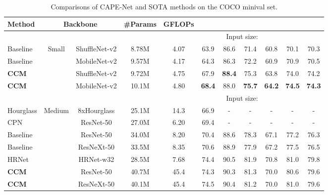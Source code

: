 \documentclass[twocolumn]{svjour3}          \smartqed  \usepackage{natbib}
\begin{document}
\begin{table*}[htbp]
\centering
  \caption{Comparisons of CAPE-Net and SOTA methods on the COCO minival set.}
    \begin{tabular}{llccccccccc}
\toprule
      Method    & \multicolumn{2}{c}{Backbone} & \#Params & GFLOPs &    &   &   &    &    &  \\
    \midrule
     & &  & & \multicolumn{7}{c}{Input size: } \\
    Baseline \citep{xiao2018simple} & \multicolumn{1}{c}{\multirow{4}[0]{*}{Small}} & ShuffleNet-v2 & 8.78M & 4.07 & 63.9    &  86.6     &  71.4     &  60.8     &  70.1     & 70.3 \\
    Baseline \citep{xiao2018simple} & \multicolumn{1}{c}{} & MobileNet-v2 & 9.57M & 4.17 & 64.3     &  86.3     &  72.2     &  60.9     &  70.9     & 70.5 \\
    \textbf{CCM} & \multicolumn{1}{c}{} & ShuffleNet-v2 & 9.72M & 4.75 & {67.9}     &  \textbf{88.4}     &  {75.3}     &  {63.8}     &  {74.0}    & {74.2}\\
    \textbf{CCM} & \multicolumn{1}{c}{} & MobileNet-v2 & 10.1M & 4.80 & \textbf{68.4}     &  {88.0}     &  \textbf{75.7}     &  \textbf{64.2}     &  \textbf{74.5}    & \textbf{74.3} \\
    \midrule
    \midrule
    & &  & & \multicolumn{7}{c}{Input size: } \\
    Hourglass \citep{newell2016stacked} & \multicolumn{1}{c}{\multirow{8}[0]{*}{Medium}} & 8xHourglass & 25.1M & 14.3 &  66.9     &   -    &    -   &    -   &    -   & - \\
    CPN \citep{chen2018cascaded} & \multicolumn{1}{c}{}  & ResNet-50 & 27.0M & 6.20 & 69.4     &  -     &   -    &   -    &   -    & - \\
    Baseline \citep{xiao2018simple} & \multicolumn{1}{c}{}  & ResNet-50 & 34.0M & 8.20 & 70.4     &  88.6     &  78.3     &  67.1     &  77.2     & 76.3 \\
    Baseline \citep{xiao2018simple} & \multicolumn{1}{c}{}  & ResNeXt-50 & 33.5M & 8.35 & 70.6     &  88.9     &  77.9    &  67.2     &  77.5     & 76.5 \\
    HRNet \citep{sun2019deep} & \multicolumn{1}{c}{}  & HRNet-w32 & 28.5M & 7.68 & 74.4     &  90.5     &  81.9     &  70.8     &  81.0    & 79.8 \\
    \textbf{CCM} & \multicolumn{1}{c}{}  & ResNet-50 & 40.7M & 45.4 & 74.3         & 90.3         & 81.3         &  70.0        &  80.6       & 79.6  \\
    \textbf{CCM} & \multicolumn{1}{c}{}  & ResNeXt-50 & 40.1M & 45.4 & 74.5         & 90.4         & 81.2         &  70.0        &  81.0       & 79.6  \\

\end{tabular}
\end{table*}
\end{document}
